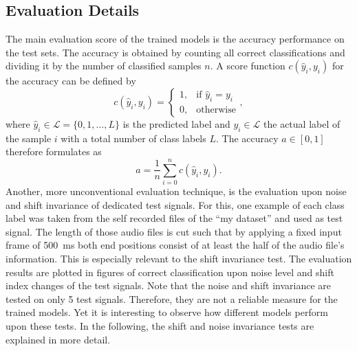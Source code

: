 
\subsection{Evaluation Details}\label{sec:exp_details_tb}
The main evaluation score of the trained models is the accuracy performance on the test sets.
The accuracy is obtained by counting all correct classifications and dividing it by the number of classified samples $n$.
A score function $c(\hat{y}_i, y_i)$ for the accuracy can be defined by
\begin{equation}
  c(\hat{y}_i, y_i) = 
  \begin{cases}
    1, & \text{if } \hat{y}_i = y_i\\
    0, & \text{otherwise} 
  \end{cases},
\end{equation}
where $\hat{y}_i \in \mathcal{L} = \{0, 1, \dots, L\} $ is the predicted label and $y_i \in \mathcal{L}$ the actual label of the sample $i$ with a total number of class labels $L$.
The accuracy $a \in [0, 1]$ therefore formulates as
\begin{equation}
  a = \frac{1}{n} \sum_{i=0}^n c(\hat{y}_i, y_i).
\end{equation}
Another, more unconventional evaluation technique, is the evaluation upon noise and shift invariance of dedicated test signals.
For this, one example of each class label was taken from the self recorded files of the \enquote{my dataset} and used as test signal.
The length of those audio files is cut such that by applying a fixed input frame of \SI{500}{\milli\second} both end positions consist of at least the half of the audio file's information.
This is especially relevant to the shift invariance test.
The evaluation results are plotted in figures of correct classification upon noise level and shift index changes of the test signals.
Note that the noise and shift invariance are tested on only 5 test signals.
Therefore, they are not a reliable measure for the trained models.
Yet it is interesting to observe how different models perform upon these tests.
In the following, the shift and noise invariance tests are explained in more detail.



